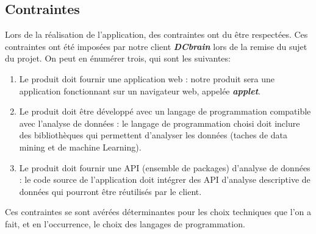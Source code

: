 		\subsection{Contraintes}
		Lors de la réalisation de l'application, des contraintes ont du être respectées. Ces contraintes ont été imposées par notre client \textbf{\textit{DCbrain}} lors de la remise du sujet du projet. On peut en énumérer trois, qui sont les suivantes:
		\begin{enumerate}
			\item Le produit doit fournir une application web : notre produit sera une application fonctionnant sur un navigateur web, appelée \textbf{\textit{applet}}.
			\item Le produit doit être développé avec un langage de programmation compatible avec l'analyse de données : le langage de programmation choisi doit inclure des bibliothèques qui permettent d'analyser les données (taches de data mining et de machine Learning).
			\item Le produit doit fournir une API (ensemble de packages) d'analyse de données : le code source de l'application doit intégrer des API d'analyse descriptive de données qui pourront être réutilisés par le client.
		\end{enumerate}	
		Ces contraintes se sont avérées déterminantes pour les choix techniques que l'on a fait, et en l'occurrence, le choix des langages de programmation. 
		
